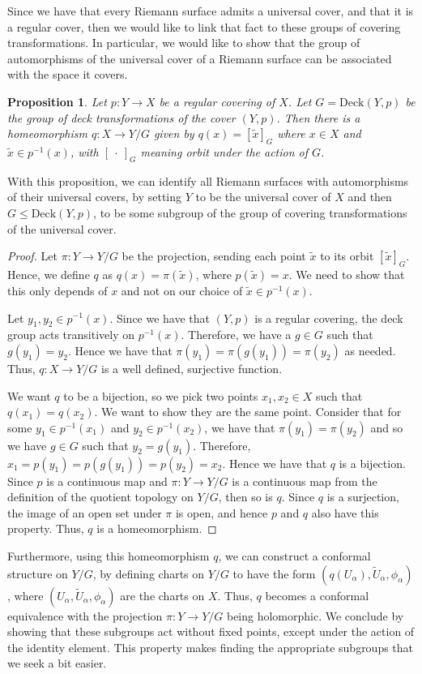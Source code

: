 \documentclass[11pt]{report}
\newtheorem{prop}[thm]{Proposition}
\theoremstyle{definition}
\begin{document}
Since we have that every Riemann surface admits a universal cover, and that it is a regular cover, then we would like to link that fact to these groups of covering transformations. In particular, we would like to show that the group of automorphisms of the universal cover of a Riemann surface can be associated with the space it covers.
\begin{prop}
  Let $p:Y \rightarrow X$ be a regular covering of $X$. Let $G = \text{Deck}(Y,p)$ be the group of deck transformations of the cover $(Y,p)$. Then there is a homeomorphism $q:X\rightarrow Y/G$ given by $q(x)=[\tilde{x}]_G$ where $x \in X$ and $\tilde{x} \in p^{-1}(x)$, with $[\: \cdot \: ]_G$ meaning orbit under the action of $G$. 
\end{prop}
With this proposition, we can identify all Riemann surfaces with automorphisms of their universal covers, by setting $Y$ to be the universal cover of $X$ and then $G \leq \text{Deck}(Y,p)$, to be some subgroup of the group of covering transformations of the universal cover.
\begin{proof}
  Let $\pi : Y \rightarrow Y/G$ be the projection, sending each point $\tilde{x}$ to its orbit $[\tilde{x}]_G$. Hence, we define $q$ as $q(x) = \pi(\tilde{x})$, where $p(\tilde{x})=x$. We need to show that this only depends of $x$ and not on our choice of $\tilde{x} \in p^{-1}(x)$. 
  
  Let $y_1,y_2 \in p^{-1}(x)$. Since we have that $(Y,p)$ is a regular covering, the deck group acts transitively on $p^{-1}(x)$. Therefore, we have a $g \in G$ such that $g(y_1) = y_2$. Hence we have that $\pi(y_1) = \pi(g(y_1))=\pi(y_2)$ as needed. Thus, $q:X \rightarrow Y/G$ is a well defined, surjective function. 
  
  We want $q$ to be a bijection, so we pick two points $x_1,x_2 \in X$ such that $q(x_1)=q(x_2)$. We want to show they are the same point. Consider that for some $y_1 \in p^{-1}(x_1)$ and $y_2 \in p^{-1}(x_2)$, we have that $\pi(y_1) = \pi(y_2)$ and so we have $g \in G$ such that $y_2 = g(y_1)$. Therefore, $x_1 = p(y_1) = p(g(y_1))=p(y_2)=x_2$. Hence we have that $q$ is a bijection. Since $p$ is a continuous map and $\pi:Y \rightarrow Y/G$ is a continuous map from the definition of the quotient topology on $Y/G$, then so is $q$. Since $q$ is a surjection, the image of an open set under $\pi$ is open, and hence $p$ and $q$ also have this property. Thus, $q$ is a homeomorphism.
\end{proof}
Furthermore, using this homeomorphism $q$, we can construct a conformal structure on $Y/G$, by defining charts on $Y/G$ to have the form $(q(U_{\alpha}), \widetilde{U}_{\alpha}, \phi_{\alpha})$, where $(U_{\alpha}, \widetilde{U}_{\alpha}, \phi_{\alpha})$ are the charts on $X$. Thus, $q$ becomes a conformal equivalence with the projection $\pi:Y\rightarrow Y/G$ being holomorphic. We conclude by showing that these subgroups act without fixed points, except under the action of the identity element. This property makes finding the appropriate subgroups that we seek a bit easier. 
\end{document}

